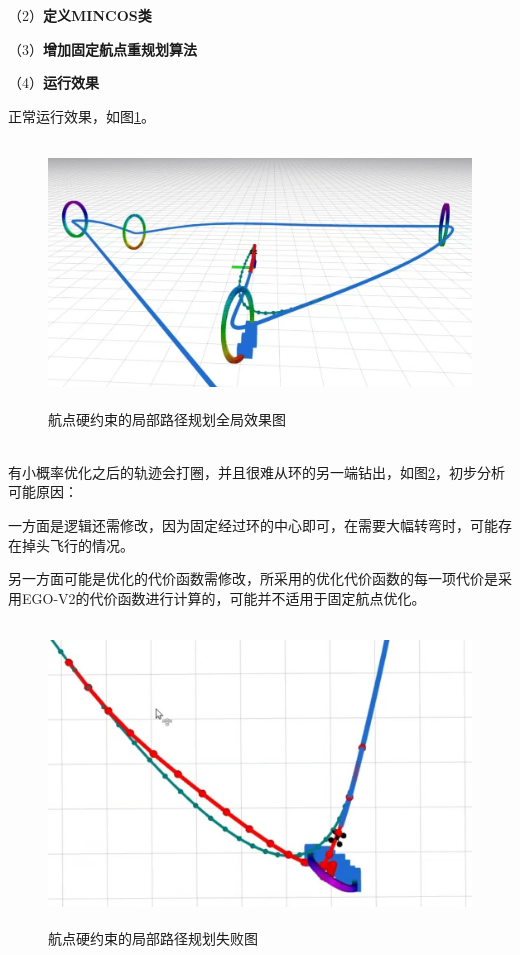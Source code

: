 （2）\textbf{定义MINCOS类}


（3）\textbf{增加固定航点重规划算法}


（4）\textbf{运行效果}


正常运行效果，如图\ref{image2}。
\begin{figure}[htbp]
    \centering
    \includegraphics[width=16cm, height=7cm]{image/2.jpg}
    \caption{航点硬约束的局部路径规划全局效果图}\label{image2}
\end{figure}\\


有小概率优化之后的轨迹会打圈，并且很难从环的另一端钻出，如图\ref{image3}，初步分析可能原因：


一方面是逻辑还需修改，因为固定经过环的中心即可，在需要大幅转弯时，可能存在掉头飞行的情况。


另一方面可能是优化的代价函数需修改，所采用的优化代价函数的每一项代价是采用EGO-V2的代价函数进行计算的，可能并不适用于固定航点优化。


\begin{figure}[htbp]
    \centering
    \includegraphics[width=14cm, height=8cm]{image/3.jpg}
    \caption{航点硬约束的局部路径规划失败图}\label{image3}
\end{figure}
